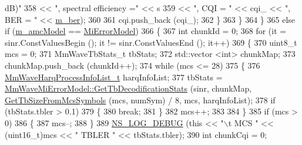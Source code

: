 \begin{DoxyCode}
{       dB)"}
358                                                                 << \textcolor{stringliteral}{", spectral efficiency ="} << s
359                                                                 << \textcolor{stringliteral}{", CQI = "} << cqi\_ << \textcolor{stringliteral}{", BER = "} << 
      \hyperlink{classns3_1_1MmWaveAmc_ac0e911c1ebab08ab7c52713ea5b35a15}{m\_ber});
360 
361                         cqi.push\_back (cqi\_);
362                         \}
363                 \}
364         \}
365         \textcolor{keywordflow}{else} \textcolor{keywordflow}{if} (\hyperlink{classns3_1_1MmWaveAmc_a4518d21ebad09825dd22466951c6935b}{m\_amcModel} == \hyperlink{classns3_1_1MmWaveAmc_a2805c1e6b48cb88e9cf86b062e079401ac8de076cfbfb1280afab7b9590e00151}{MiErrorModel})
366         \{
367                 \textcolor{keywordtype}{int} chunkId = 0;
368                 \textcolor{keywordflow}{for} (it = sinr.ConstValuesBegin (); it != sinr.ConstValuesEnd (); it++)
369                 \{
370                         uint8\_t mcs = 0;
371                         MmWaveTbStats\_t tbStats;
372                         std::vector <int> chunkMap;
373                         chunkMap.push\_back (chunkId++);
374                         \textcolor{keywordflow}{while} (mcs <= 28)
375                         \{
376                                 \hyperlink{namespacens3_aca7c6bab455c2515f3e437749b5e904d}{MmWaveHarqProcessInfoList\_t} harqInfoList;
377                                 tbStats = 
      \hyperlink{classns3_1_1MmWaveMiErrorModel_a82a14ebf85ae03a7815215c3c1a96cc7}{MmWaveMiErrorModel::GetTbDecodificationStats} (sinr, chunkMap, 
      \hyperlink{classns3_1_1MmWaveAmc_a7e972b1d61df4f0236301ecb24f13447}{GetTbSizeFromMcsSymbols} (mcs, numSym) / 8, mcs, harqInfoList);
378                                 \textcolor{keywordflow}{if} (tbStats.tbler > 0.1)
379                                 \{
380                                         \textcolor{keywordflow}{break};
381                                 \}
382                                 mcs++;
383 
384                         \}
385                         \textcolor{keywordflow}{if} (mcs > 0)
386                         \{
387                                 mcs--;
388                         \}
389                         \hyperlink{group__logging_ga413f1886406d49f59a6a0a89b77b4d0a}{NS\_LOG\_DEBUG} (\textcolor{keyword}{this} << \textcolor{stringliteral}{"\(\backslash\)t MCS "} << (uint16\_t)mcs << \textcolor{stringliteral}{" TBLER "} << 
      tbStats.tbler);
390                         \textcolor{keywordtype}{int} chunkCqi = 0;

\end{DoxyCode}
